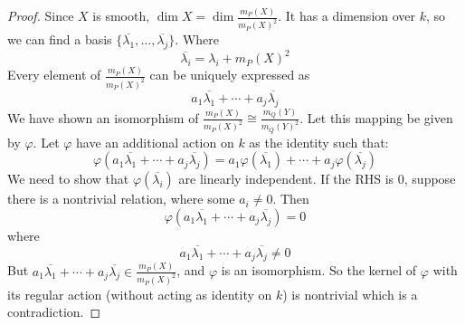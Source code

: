 \documentclass{article}
\begin{document}
\begin{itemize}
\begin{proof}
                Since $X$ is smooth, $\dim X = \dim\frac{ m_{P}(X)}{m_{P}(X)^{2}}$. It has a dimension over $k$, so we can find a basis $\{\overline{ \lambda_{ 1}}, \ldots, \overline{ \lambda_{ j}}\}$. Where
                    \begin{equation*}
                        \overline{\lambda_{ i}} = \lambda_{ i} + m_{P}(X)^{2}
                    \end{equation*}
                Every element of $\frac{m_{P}(X)}{m_{P}(X)^{2}}$ can be uniquely expressed as
                    \begin{equation*}
                        a_{1}\overline{\lambda_{1}} + \cdots + a_{j}\overline{\lambda_{j}}
                    \end{equation*}
                We have shown an isomorphism of $\frac{m_{P}(X)}{m_{P}(X)^{2}} \cong\frac{ m_{Q}(Y)}{m_{Q}(Y)^{2}}$. Let this mapping be given by $\varphi$. Let $\varphi$ have an additional action on $k$ as the identity such that:
                    \begin{equation*}
                        \varphi ( a_{1} \overline{\lambda_{ 1}} + \cdots + a_{ j}\overline{\lambda_{j}}) = a_{1}\varphi ( \overline{\lambda_{ 1}}) + \cdots + a_{j}\varphi ( \overline{\lambda_{j}})
                    \end{equation*}
                We need to show that $\varphi ( \overline{\lambda_{ i}})$ are linearly independent. If the RHS is $0$, suppose there is a nontrivial relation, where some $a_{i} \neq 0$. Then
                    \begin{equation*}
                        \varphi ( a_{1}\overline{\lambda_{1}} + \cdots + a_{ j}\overline{\lambda_{j}}) = 0
                    \end{equation*}
                where
                    \begin{equation*}
                        a_{1}\overline{\lambda_{1}} + \cdots + a_{ j}\overline{\lambda_{j}} \neq 0
                    \end{equation*}
                But $a_{1}\overline{\lambda_{1}} + \cdots + a_{j}\overline{ \lambda_{j}} \in\frac{ m_{P}(X)}{m_{P}(X)^{2}}$, and $\varphi$ is an isomorphism. So the kernel of $\varphi$ with its regular action (without acting as identity on $k$) is nontrivial which is a contradiction. 


\end{proof}
\end{itemize}
\end{document}
